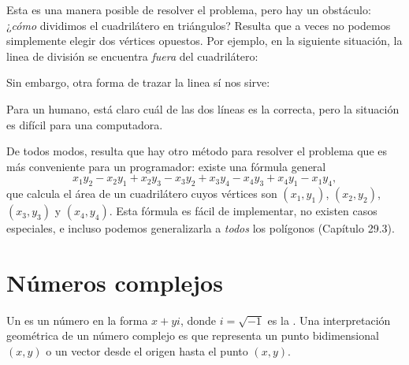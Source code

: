Esta es una manera posible de resolver el problema, pero hay un obstáculo:
¿\emph{cómo} dividimos el cuadrilátero en triángulos? Resulta que a veces no
podemos simplemente elegir dos vértices opuestos. Por ejemplo, en la siguiente
situación, la linea de división se encuentra \emph{fuera} del cuadrilátero:
\begin{center}
\end{center}
Sin embargo, otra forma de trazar la linea sí nos sirve:
\begin{center}
\end{center}
Para un humano, está claro cuál de las dos líneas es la correcta, pero la
situación es difícil para una computadora.

De todos modos, resulta que hay otro método para resolver el problema
que es más conveniente para un programador: existe una fórmula general
\[x_1y_2-x_2y_1+x_2y_3-x_3y_2+x_3y_4-x_4y_3+x_4y_1-x_1y_4,\]
que calcula el área de un cuadrilátero cuyos vértices son
$(x_1,y_1)$,
$(x_2,y_2)$,
$(x_3,y_3)$ y
$(x_4,y_4)$.
Esta fórmula es fácil de implementar, no existen casos especiales, e incluso
podemos generalizarla a \emph{todos} los polígonos (Capítulo 29.3).

\section{Números complejos}


Un  es un número en la forma $x+y i$, donde
$i = \sqrt{-1}$ es la . Una interpretación geométrica
de un número complejo es que representa un punto bidimensional $(x,y)$ o un
vector desde el origen hasta el punto $(x,y)$.


